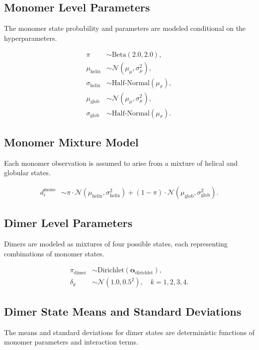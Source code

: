 \documentclass[12pt]{article}
\begin{document}
\subsection{Monomer Level Parameters}
The monomer state probability and parameters are modeled conditional on the hyperparameters.

\begin{align}
    \pi &\sim \text{Beta}(2.0, 2.0), \\
    \mu_{\text{helix}} &\sim \mathcal{N}(\mu_{\mu}, \sigma_{\mu}^2), \\
    \sigma_{\text{helix}} &\sim \text{Half-Normal}(\mu_{\sigma}), \\
    \mu_{\text{glob}} &\sim \mathcal{N}(\mu_{\mu}, \sigma_{\mu}^2), \\
    \sigma_{\text{glob}} &\sim \text{Half-Normal}(\mu_{\sigma}).
\end{align}

\subsection{Monomer Mixture Model}
Each monomer observation is assumed to arise from a mixture of helical and globular states.

\begin{align}
    d_i^{\text{mono}} &\sim \pi \cdot \mathcal{N}(\mu_{\text{helix}}, \sigma_{\text{helix}}^2) + (1 - \pi) \cdot \mathcal{N}(\mu_{\text{glob}}, \sigma_{\text{glob}}^2).
\end{align}

\subsection{Dimer Level Parameters}
Dimers are modeled as mixtures of four possible states, each representing combinations of monomer states.

\begin{align}
    \pi_{\text{dimer}} &\sim \text{Dirichlet}(\bm{\alpha}_{\text{dirichlet}}), \\
    \delta_k &\sim \mathcal{N}(1.0, 0.5^2), \quad k = 1, 2, 3, 4.
\end{align}

\subsection{Dimer State Means and Standard Deviations}
The means and standard deviations for dimer states are 
deterministic functions of monomer parameters and interaction terms.
\end{document}
